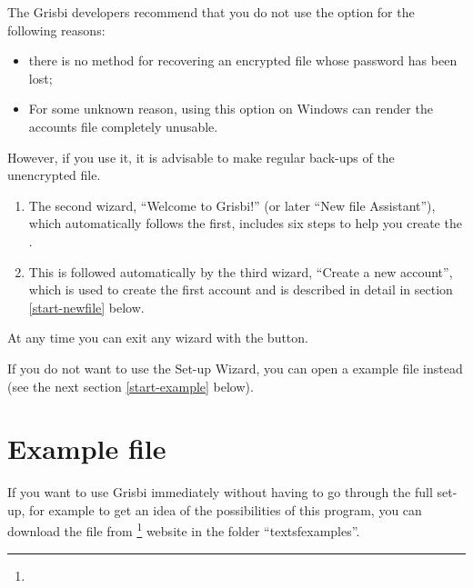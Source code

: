 The Grisbi developers recommend that you do not use the  option for the following reasons:
\begin{itemize}
	\item there is no method for recovering an encrypted file whose password has been lost;
	\item For some unknown reason, using this option on Windows can render the accounts file completely unusable.
\end{itemize}  
However, if you use it, it is advisable to make regular back-ups of the unencrypted file.

\begin{enumerate}[resume]
	\item The second wizard, \enquote{Welcome to Grisbi!} (or later \enquote{New file Assistant}), which automatically follows the first, includes six steps to help you create the .%
	\item This is followed automatically by the third wizard, \enquote{Create a new account}, which is used to create the first account and is described in detail in section \ref{start-newfile} below.%
\end{enumerate}

At any time you can exit any wizard with the  button.

If you do not want to use the Set-up Wizard, you can open a example file instead (see the next section \ref{start-example} below).



\section{Example file\label{start-example}}


If you want to use Grisbi immediately without having to go through the full set-up, for example to get an idea of the possibilities of this program, you can download the   file from \footnote{\urlSourceForgeDocumentation{}} website in the folder \enquote{textsf{examples}}.

